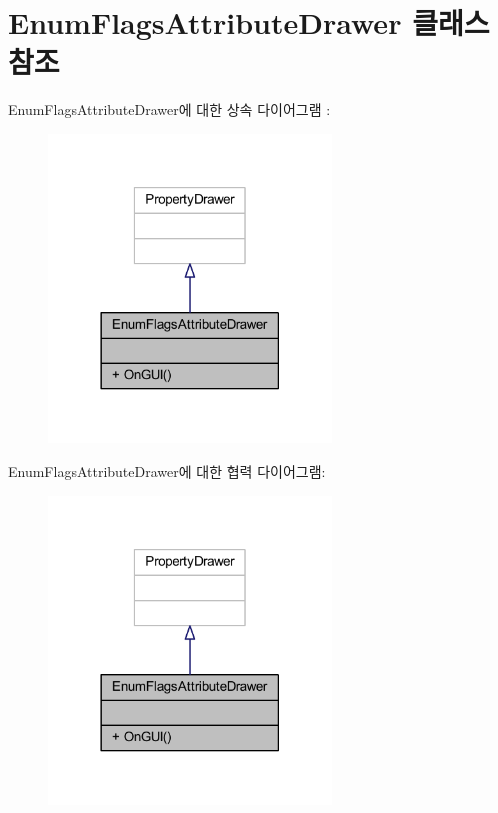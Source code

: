 \hypertarget{class_enum_flags_attribute_drawer}{}\section{Enum\+Flags\+Attribute\+Drawer 클래스 참조}
\label{class_enum_flags_attribute_drawer}


Enum\+Flags\+Attribute\+Drawer에 대한 상속 다이어그램 \+: 
\nopagebreak
\begin{figure}[H]
\begin{center}
\leavevmode
\includegraphics[width=213pt]{d9/d54/class_enum_flags_attribute_drawer__inherit__graph}
\end{center}
\end{figure}


Enum\+Flags\+Attribute\+Drawer에 대한 협력 다이어그램\+:
\nopagebreak
\begin{figure}[H]
\begin{center}
\leavevmode
\includegraphics[width=213pt]{d5/dc5/class_enum_flags_attribute_drawer__coll__graph}
\end{center}
\end{figure}
